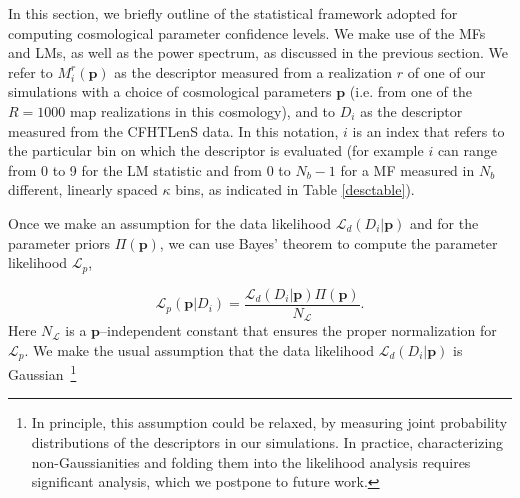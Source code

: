 \documentclass[reprint,aps,prd,superscriptaddress,showkeys,showpacs]{revtex4-1}
\begin{document}
In this section, we briefly outline of the statistical framework
adopted for computing cosmological parameter confidence levels.  We
make use of the MFs and LMs, as well as the power spectrum, as
discussed in the previous section. We refer to $M_i^r(\mathbf{p})$ as
the descriptor measured from a realization $r$ of one of our
simulations with a choice of cosmological parameters $\mathbf{p}$
(i.e. from one of the $R=1000$ map realizations in this cosmology), and to $D_i$
as the descriptor measured from the CFHTLenS data.
In this notation, $i$ is an index that refers to the particular bin on
which the descriptor is evaluated (for example $i$ can range from 0 to
9 for the LM statistic and from 0 to $N_b-1$ for a MF measured in
$N_b$ different, linearly spaced $\kappa$ bins, as indicated in Table \ref{desctable}).


Once we make an assumption for the data likelihood
$\mathcal{L}_d(D_i\vert \mathbf{p})$ and for the parameter priors
$\Pi(\mathbf{p})$, we can use Bayes' theorem to compute the parameter
likelihood $\mathcal{L}_p$,

\begin{equation}
\label{parameterlikelihood}
\mathcal{L}_p(\mathbf{p}\vert D_i) = \frac{\mathcal{L}_d(D_i\vert \mathbf{p})\Pi(\mathbf{p})}{N_{\mathcal{L}}}.
\end{equation}
%
Here $N_{\mathcal{L}}$ is a $\mathbf{p}$--independent constant that
ensures the proper normalization for $\mathcal{L}_p$. We make the
usual assumption that the data likelihood $\mathcal{L}_d(D_i\vert
\mathbf{p})$ is Gaussian~\footnote{In principle, this assumption could
  be relaxed, by measuring joint probability distributions of the
  descriptors in our simulations.  In practice, characterizing
  non-Gaussianities and folding them into the likelihood analysis
  requires significant analysis, which we postpone to future work.}

%
\end{document}
